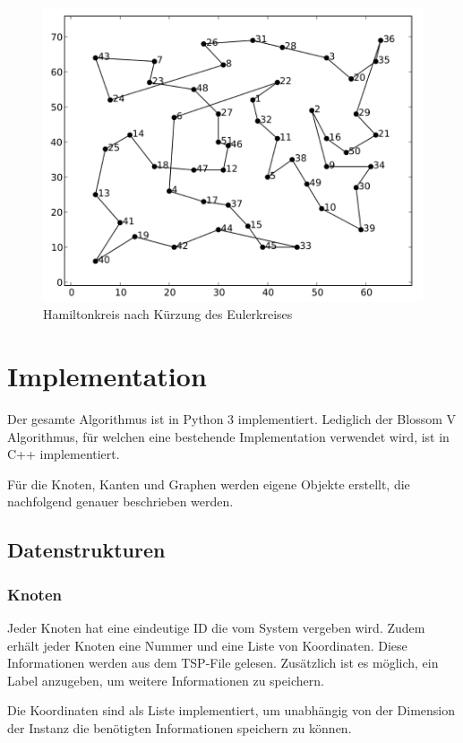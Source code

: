 \documentclass[11pt,a4paper]{article}
\begin{document}
\begin{figure}[H]
        \centering
        \includegraphics[width=13cm]{gfx/eil51_tour}
        \caption{Hamiltonkreis nach Kürzung des Eulerkreises}
        \label{img:eil51_tour}
\end{figure}

\newpage
\section{Implementation}
Der gesamte Algorithmus ist in Python 3 implementiert. Lediglich der Blossom V Algorithmus, für welchen eine bestehende Implementation verwendet wird, ist in C++ implementiert.

Für die Knoten, Kanten und Graphen werden eigene Objekte erstellt, die nachfolgend genauer beschrieben werden. 

\subsection{Datenstrukturen}
\subsubsection{Knoten}
Jeder Knoten hat eine eindeutige ID die vom System vergeben wird. Zudem erhält jeder Knoten eine Nummer und eine Liste von Koordinaten. Diese Informationen werden aus dem TSP-File gelesen. Zusätzlich ist es möglich, ein Label anzugeben, um weitere Informationen zu speichern.

Die Koordinaten sind als Liste implementiert, um unabhängig von der Dimension der Instanz die benötigten Informationen speichern zu können.
\end{document}
